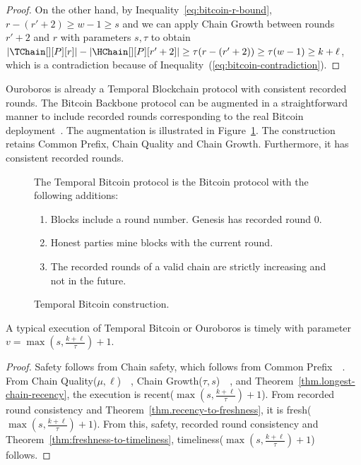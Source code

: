 \begin{proof}
  On the other hand, by Inequality~\ref{eq:bitcoin-r-bound}, $r - (r' + 2) \geq w - 1 \geq s$ and
  we can apply Chain Growth between rounds $r' + 2$ and $r$
  with parameters $s, \tau$ to obtain
  $|\TChain[][P][r]| - |\HChain[][P][r' + 2]| \geq \tau(r - (r' + 2)) \geq \tau (w - 1) \geq  k + \ell$,
  which is a contradiction because of Inequality~(\ref{eq:bitcoin-contradiction}).
  \Qed
\end{proof}

Ouroboros is already a Temporal Blockchain protocol with consistent recorded rounds.
The Bitcoin Backbone protocol can be augmented in a
straightforward manner to include recorded rounds
corresponding to the real Bitcoin deployment~\cite{mastering-bitcoin}.
The augmentation is illustrated in Figure~\ref{fig.temporal-backbone}.
The construction retains Common Prefix, Chain Quality and Chain Growth.
Furthermore, it has consistent recorded rounds.

\begin{figure}
  \begin{mdframed}
    The Temporal Bitcoin protocol is the Bitcoin protocol with
    the following additions:

    \begin{enumerate}
      \item Blocks include a round number. Genesis has recorded round $0$.
      \item Honest parties mine blocks with the current round.
      \item The recorded rounds of a valid chain are strictly increasing and not in the future.
    \end{enumerate}
  \end{mdframed}
  \caption{Temporal Bitcoin construction.}
  \label{fig.temporal-backbone}
\end{figure}

\begin{corollary}
  A typical execution of Temporal Bitcoin or Ouroboros is timely with parameter
  $v = \max(s, \frac{k + \ell}{\tau}) + 1$.
\end{corollary}
\begin{proof}
  Safety follows from Chain safety, which follows from Common Prefix~\cite[Theorem 15]{backbone}~\cite[Theorem 4.31]{ouroboros}.
  From Chain Quality($\mu,\ell$)~\cite[Theorem 16]{backbone}~\cite[Lemma 4.19]{ouroboros},
  Chain Growth($\tau, s$)~\cite[Theorem 12]{backbone}~\cite[Lemma 4.22]{ouroboros}, and Theorem~\ref{thm.longest-chain-recency},
  the execution is recent($\max(s, \frac{k + \ell}{\tau}) + 1$).
  From recorded round consistency and Theorem~\ref{thm.recency-to-freshness}, it is
  fresh($\max(s, \frac{k + \ell}{\tau}) + 1$).
  From this, safety, recorded round consistency and Theorem~\ref{thm:freshness-to-timeliness},
  timeliness($\max(s, \frac{k + \ell}{\tau}) + 1$) follows.
  \Qed
\end{proof}